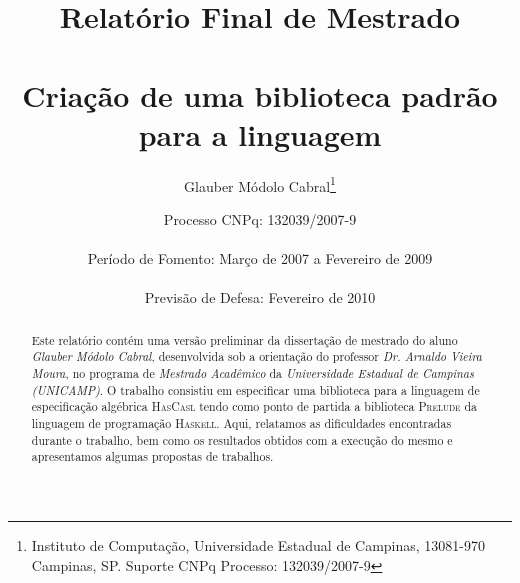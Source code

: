 \documentclass[11pt,twoside,a4paper]{report}
\title{\textbf{Relatório Final de Mestrado}\\
\ \\
Criação de uma biblioteca padrão para a linguagem \HasCASL}
\author{Glauber Módolo Cabral\thanks{Instituto  de Computação, Universidade Estadual  de Campinas, 13081-970  Campinas,  SP.  Suporte CNPq Processo: 132039/2007-9}}
\date{Processo CNPq: 132039/2007-9\\
\ \\
Período de Fomento: Março de 2007 a Fevereiro de 2009\\
\ \\
Previsão de Defesa: Fevereiro de 2010}
\newcommand{\HasCASL}{\textsc{HasCasl}\xspace}
\newcommand{\Haskell}{\textsc{Haskell}\xspace}
\newcommand{\Prelude}{\textsc{Prelude}\xspace}
\begin{document}
\maketitle

\begin{abstract}
Este relatório contém uma versão preliminar da dissertação de mestrado do aluno \textit{Glauber Módolo Cabral}, desenvolvida sob a orientação do professor \textit{Dr. Arnaldo Vieira Moura}, no programa de \textit{Mestrado Acadêmico} da \textit{Universidade Estadual de Campinas (UNICAMP)}.
O trabalho consistiu em especificar uma biblioteca para a linguagem de especificação algébrica \HasCASL tendo como ponto de partida a biblioteca \Prelude da linguagem de programação \Haskell.
Aqui, relatamos as dificuldades encontradas durante o trabalho, bem como os resultados obtidos com a execução do mesmo e  apresentamos algumas propostas de trabalhos.
\end{abstract}

\setcounter{page}{1}
\tableofcontents 
\newpage
{}
\setcounter{page}{1}











\newpage
\appendix

\renewcommand{\appendixpagename}{Apêndices}
\appendixpage





\end{document}
